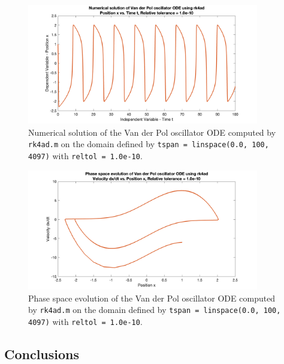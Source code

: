 \documentclass[10pt]{article}
\def\code#1{\texttt{#1}} %
\begin{document}
\begin{figure}[H]
\centering
\includegraphics[width=0.9\textwidth]{trk4ad_vdp_1.png}
\caption{Numerical solution of the Van der Pol oscillator ODE computed by \code{rk4ad.m} on the domain
defined by \code{tspan = linspace(0.0, 100, 4097)} with \code{reltol = 1.0e-10}.}
\label{trk4ad_vdp_1_fig}
\end{figure}

\begin{figure}[H]
\centering
\includegraphics[width=0.9\textwidth]{trk4ad_vdp_2.png}
\caption{Phase space evolution of the Van der Pol oscillator ODE computed by \code{rk4ad.m} on the domain
defined by \code{tspan = linspace(0.0, 100, 4097)} with \code{reltol = 1.0e-10}.}
\label{trk4ad_vdp_2_fig}
\end{figure}

\subsection*{Conclusions}


\pagebreak

\end{document}
